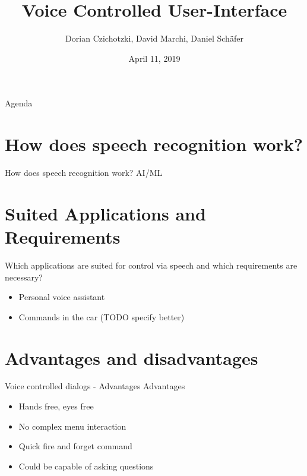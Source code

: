\documentclass[
  10pt
, handout
]{beamer}
\title{Voice Controlled User-Interface}
\subtitle{}
\date{April 11, 2019}
\author{Dorian Czichotzki, David Marchi, Daniel Schäfer}
\begin{document}
\maketitle

\begin{frame}{Agenda}
  \tableofcontents[pausesections]
\end{frame}

\section{How does speech recognition work?}  %

\begin{frame}{How does speech recognition work?}
  AI/ML
\end{frame}

\section{Suited Applications and Requirements}  %

\begin{frame}{Which applications are suited for control via speech and which requirements are necessary?}
  \begin{itemize}
    \item Personal voice assistant
    \item Commands in the car (TODO specify better)
  \end{itemize}
\end{frame}

\section{Advantages and disadvantages}  %

\begin{frame}{Voice controlled dialogs - Advantages}
  Advantages

  \begin{itemize}
    \item<1-> Hands free, eyes free
    \item<2-> No complex menu interaction
    \item<3-> Quick fire and forget command
    \item<4-> Could be capable of asking questions
  \end{itemize}
\end{frame}
\end{document}
